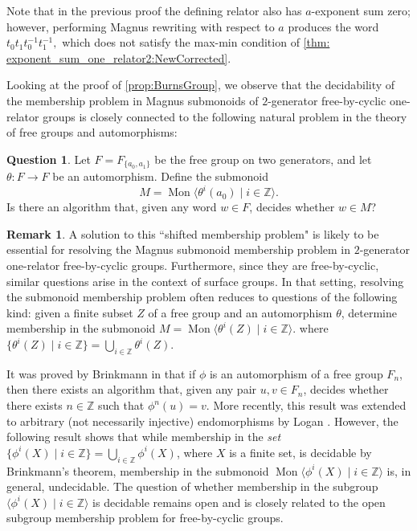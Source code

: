 \documentclass[11pt]{amsart}
\newcommand{\Mgen}[1]{\operatorname{Mon}\bigl\langle #1 \bigr\rangle}
\newcommand{\Ggen}[1]{\bigl\langle #1 \bigr\rangle}
\newcommand{\Z}{\mathbb{Z}}
\theoremstyle{plain}
\theoremstyle{definition}
\newtheorem{question}[theorem]{Question}
\newtheorem{remark}[theorem]{Remark}
\begin{document}
Note that in the previous proof the defining relator also has $a$-exponent sum zero; however, performing Magnus rewriting with respect to $a$ produces the word 
$
t_0 t_1 t_0^{-1} t_1^{-1},
$
which does not satisfy the max-min condition of \cref{thm: exponent_sum_one_relator2:NewCorrected}.

Looking at the proof of \cref{prop:BurnsGroup}, we observe that the decidability of the membership problem in Magnus submonoids of $2$-generator free-by-cyclic one-relator groups is closely connected to the following natural problem in the theory of free groups and automorphisms:

\begin{question}
\label{qn:orbit}
Let $F = F_{\{ a_0,a_1 \} }$ be the free group on two generators, and let $\theta: F \to F$ be an automorphism. Define the submonoid
\[
M = \Mgen{\theta^i(a_0) \mid i \in \Z}.
\]
Is there an algorithm that, given any word $w \in F$, decides whether $w \in M$?
\end{question}

\begin{remark}\label{rmk:FreeByCyclic}
A solution to this ``shifted membership problem" is likely to be essential for resolving the Magnus submonoid membership problem in $2$-generator one-relator free-by-cyclic groups.
Furthermore, since they are free-by-cyclic, similar questions arise in the context of surface groups. In that setting, resolving the submonoid membership problem often reduces to questions of the following kind: given a finite subset $Z$ of a free group and an automorphism $\theta$, determine membership in the submonoid
$
M = \Mgen{\theta^i(Z) \mid i \in \Z}.
$
where 
$\{  \theta^i(Z) \mid i \in \Z \} = 
\bigcup_{i \in \Z} \theta^i(Z)$. 
\end{remark}


It was proved by Brinkmann in \cite{Brinkmann2010} 
that if $\phi$ is an automorphism of a free group $F_n$, then there exists an algorithm that, given any pair $u, v \in F_n$, decides whether there exists $n \in \Z$ such that $\phi^n(u) = v$. More recently, this result was extended to arbitrary (not necessarily injective) endomorphisms by Logan \cite{Logan2022}.
However, the following result shows that while membership in the \emph{set} $\{\phi^i(X) \mid i \in \Z\} = \bigcup_{i \in \mathbb{Z}} \phi^i(X)$, where $X$ is a finite set, is decidable by Brinkmann’s theorem, membership in the submonoid $\Mgen{\phi^i(X) \mid i \in \Z}$ is, in general, undecidable.
The question of whether membership in the subgroup $\Ggen{\phi^i(X) \mid i \in \Z}$ is decidable remains open and is closely related to the open subgroup membership problem for free-by-cyclic groups.
\end{document}
